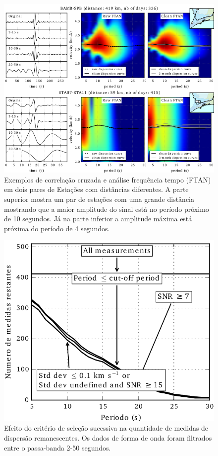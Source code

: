 \begin{figure}[!ht]
\centering
\includegraphics[scale=0.8]{Figs/dist_FTAN.png}
\caption{Exemplos de correlação cruzada e análise frequência tempo (FTAN) em dois pares de Estações com distâncias diferentes. A parte superior mostra um par de estações com uma grande distância mostrando que a maior amplitude do sinal está no período próximo de 10 segundos. Já na parte inferior a amplitude máxima está próxima do período de 4 segundos.}
\label{dist_FTAN}
\end{figure}

\begin{figure}[!ht]
\centering
\includegraphics[scale=1]{Figs/corr_selecao.png}
\caption{Efeito do critério de seleção sucessiva na quantidade de medidas de dispersão remanescentes. Os dados de forma de onda foram filtrados entre o passa-banda 2-50 segundos.}
\label{corr_selecao}
\end{figure}

